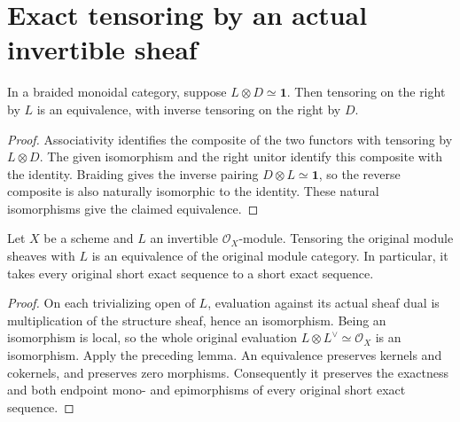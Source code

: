 \section{Exact tensoring by an actual invertible sheaf}

\begin{lemma}
\label{lem:scheme-invertible-tensor-equivalence}
\leanok
In a braided monoidal category, suppose $L\otimes D\simeq\mathbf1$.
Then tensoring on the right by $L$ is an equivalence, with inverse
tensoring on the right by $D$.
\end{lemma}
\begin{proof}
Associativity identifies the composite of the two functors with
tensoring by $L\otimes D$. The given isomorphism and the right unitor
identify this composite with the identity. Braiding gives the inverse
pairing $D\otimes L\simeq\mathbf1$, so the reverse composite is also
naturally isomorphic to the identity. These natural isomorphisms give
the claimed equivalence.
\end{proof}

\begin{theorem}
\label{thm:scheme-original-invertible-tensor-exact}
\leanok
Let $X$ be a scheme and $L$ an invertible $\mathcal O_X$-module.
Tensoring the original module sheaves with $L$ is an equivalence of
the original module category. In particular, it takes every original
short exact sequence to a short exact sequence.
\end{theorem}
\begin{proof}
On each trivializing open of $L$, evaluation against its actual sheaf
dual is multiplication of the structure sheaf, hence an isomorphism.
Being an isomorphism is local, so the whole original evaluation
$L\otimes L^\vee\simeq\mathcal O_X$ is an isomorphism. Apply the preceding
lemma. An equivalence preserves kernels and cokernels, and preserves
zero morphisms. Consequently it preserves the exactness and both
endpoint mono- and epimorphisms of every original short exact sequence.
\end{proof}
